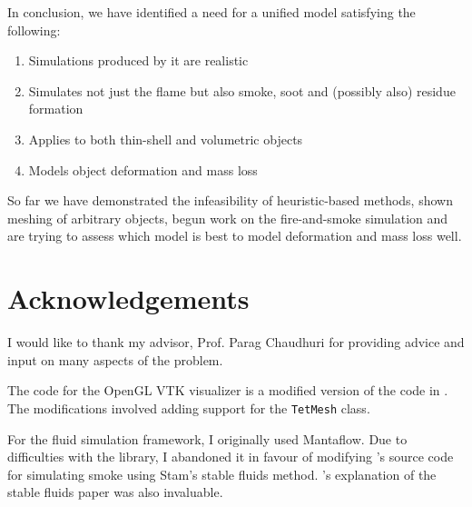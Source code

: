 \documentclass[12pt]{report}
\begin{document}
In conclusion, we have identified a need for a unified model satisfying the following:

\begin{enumerate}
  \item Simulations produced by it are realistic
  \item Simulates not just the flame but also smoke, soot and (possibly also) residue formation
  \item Applies to both thin-shell and volumetric objects
  \item Models object deformation and mass loss
\end{enumerate}

So far we have demonstrated the infeasibility of heuristic-based methods, shown meshing of arbitrary objects, begun work on the fire-and-smoke simulation and are trying to assess which model is best to model deformation and mass loss well.

\chapter{Acknowledgements}

I would like to thank my advisor, Prof. Parag Chaudhuri for providing advice and input on many aspects of the problem.

The code for the OpenGL VTK visualizer is a modified version of the code in \cite{dalling}. The modifications involved adding support for the \texttt{TetMesh} class.

For the fluid simulation framework, I originally used Mantaflow. Due to difficulties with the library, I abandoned it in favour of modifying \cite{caltech}'s source code for simulating smoke using Stam's stable fluids method. \cite{dmorris}'s explanation of the stable fluids paper was also invaluable.

{}
\end{document}
